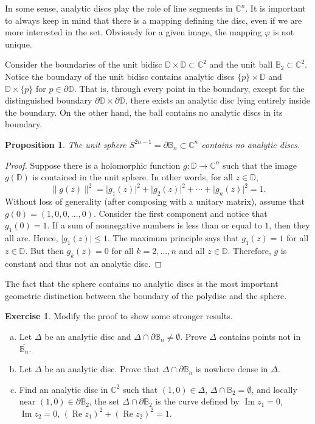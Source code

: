 \documentclass[12pt,openany]{book}
\renewcommand{\Re}{\operatorname{Re}}
\renewcommand{\Im}{\operatorname{Im}}
\newcommand{\sabs}[1]{\lvert {#1} \rvert}
\newcommand{\snorm}[1]{\lVert {#1} \rVert}
\newcommand{\C}{{\mathbb{C}}}
\newcommand{\D}{{\mathbb{D}}}
\newcommand{\bB}{{\mathbb{B}}}
\theoremstyle{plain}
\newtheorem{prop}[thm]{Proposition}
\theoremstyle{remark}
\theoremstyle{definition}
\newenvironment{exbox}{%
    \def\FrameCommand{\vrule width 1pt \relax\hspace{10pt}}%
    \MakeFramed{\advance\hsize-\width\FrameRestore}%
}{%
    \endMakeFramed
}
\newenvironment{exparts}{%
    \leavevmode\begin{enumerate}[a),noitemsep,topsep=0pt,parsep=0pt,partopsep=0pt]
}{%
    \end{enumerate}
}
\theoremstyle{exercise}
\newtheorem{exercise}{Exercise}[section]
\theoremstyle{example}
\begin{document}
In some sense, analytic discs play the role of line segments in $\C^n$.  It
is important to always keep in mind that there is a mapping defining the
disc, even if we are more interested in the set.  Obviously for a given
image, the mapping $\varphi$ is not unique.

Consider the boundaries of
the unit bidisc $\D \times \D \subset \C^2$
and the unit ball $\bB_2 \subset \C^2$.
Notice the boundary of the unit bidisc contains analytic discs
$\{p\} \times \D$
and $\D \times \{p\}$ for $p \in \partial \D$.
That is, through every point in the boundary, except for the distinguished
boundary $\partial \D \times \partial \D$, there exists an analytic disc
lying entirely inside the boundary.  On the other hand, the ball
contains no analytic discs in its boundary.

\begin{prop}\label{prop:noanaldiscinsphere}
%
The unit sphere $S^{2n-1} = \partial \bB_n \subset \C^n$
contains no analytic discs.
\end{prop}

\begin{proof}
Suppose there is a holomorphic function $g \colon \D \to \C^n$
such that the image $g(\D)$ is contained in the unit sphere.  In other words,
for all $z \in \D$,
\begin{equation*}
\snorm{g(z)}^2
= \sabs{g_1(z)}^2 + \sabs{g_2(z)}^2 + \cdots + \sabs{g_n(z)}^2 = 1 .
\end{equation*}
Without loss of generality (after composing with a unitary matrix),
assume that $g(0) = (1,0,0,\ldots,0)$.
Consider the first component and notice that $g_1(0) = 1$.
If a sum of nonnegative numbers is less than or equal to $1$,
then they all are.
Hence, $\sabs{g_1(z)} \leq 1$.
The maximum principle says
that $g_1(z) = 1$ for all $z \in \D$.  But then $g_k(z) = 0$
for all $k=2,\ldots,n$ and all $z \in \D$.  Therefore, $g$ is constant and
thus not an analytic disc.
\end{proof}

The fact that the sphere contains no analytic discs
is the most important geometric distinction between the boundary of
the polydisc and the sphere.

\begin{exbox}
\begin{exercise}
Modify the proof to show some stronger results.
\begin{exparts}
\item
Let $\Delta$ be an analytic disc
and $\Delta \cap \partial \bB_n \neq \emptyset$.
Prove $\Delta$ contains points not in
$\overline{\bB_n}$.
\item
Let $\Delta$ be an analytic disc.
Prove that $\Delta \cap \partial \bB_n$ is nowhere dense in $\Delta$.
\item
Find an analytic disc in $\C^2$ such that $(1,0) \in \Delta$, $\Delta \cap \bB_2 =
\emptyset$, and locally near
$(1,0) \in \partial \bB_2$, the set
$\Delta \cap \partial \bB_2$ is the
curve defined by $\Im z_1=0$, $\Im z_2=0$,
${(\Re z_1)}^2+ {(\Re z_2)}^2 = 1$.
\end{exparts}
\end{exercise}
\end{exbox}
\end{document}
